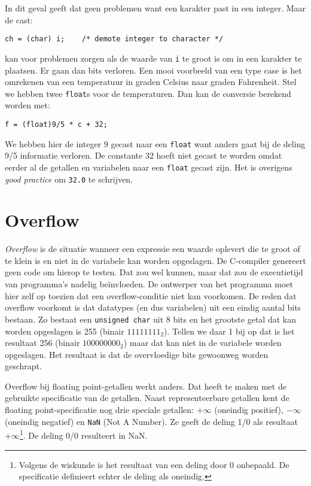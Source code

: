 In dit geval geeft dat geen problemen want een karakter past in een integer. Maar de cast:

\hspace*{1em}\texttt{ch = (char) i; \ \ \  /* demote integer to character */}

kan voor problemen zorgen als de waarde van \texttt{i} te groot is om in een karakter te plaatsen. Er gaan dan bits verloren. Een mooi voorbeeld van een type case is het omrekenen van een temperatuur in graden Celsius naar graden Fahrenheit. Stel we hebben twee \texttt{float}s voor de temperaturen. Dan kan de conversie berekend worden met:

\hspace*{1em}\texttt{f = (float)9/5 * c + 32;}

We hebben hier de integer 9 gecast naar een \texttt{float} want anders gaat bij de deling 9/5 informatie verloren. De constante 32 hoeft niet gecast te worden omdat eerder al de getallen en variabelen naar een \texttt{float} gecast zijn. Het is overigens \textsl{good practice} om \texttt{32.0} te schrijven.
 

\section{Overflow}
\textsl{Overflow} is de situatie wanneer een expressie een waarde oplevert die te groot of te klein is en niet in de variabele kan worden opgeslagen. De C-compiler genereert geen code om hierop te testen. Dat zou wel kunnen, maar dat zou de executietijd van programma's nadelig beïnvloeden. De ontwerper van het programma moet hier zelf op toezien dat een overflow-conditie niet kan voorkomen. De reden dat overflow voorkomt is dat datatypes (en dus variabelen) uit een eindig aantal bits bestaan. Zo bestaat een \texttt{unsigned char} uit 8 bits en het grootste getal dat kan worden opgeslagen is 255 (binair $11111111_2$). Tellen we daar 1 bij op dat is het resultaat 256 (binair $100000000_2$) maar dat kan niet in de variabele worden opgeslagen. Het resultaat is dat de overvloedige bits gewoonweg worden geschrapt.

Overflow bij floating point-getallen werkt anders. Dat heeft te maken met de gebruikte specificatie van de getallen.
Naast representeerbare getallen kent de floating point-specificatie nog drie speciale getallen: $+\infty$ (oneindig positief), $-\infty$ (oneindig negatief) en \texttt{NaN} (Not A Number). Ze geeft de deling 1/0 als resultaat $+\infty$\footnote{Volgens de wiskunde is het resultaat van een deling door 0 onbepaald. De specificatie definieert echter de deling als oneindig.}. De deling 0/0 resulteert in NaN.


